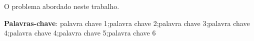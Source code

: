 
O problema abordado neste trabalho.

 \noindent \textbf{Palavras-chave}: palavra chave 1;palavra chave 2;palavra chave 3;palavra chave 4;palavra chave 4;palavra chave 5;palavra chave 6